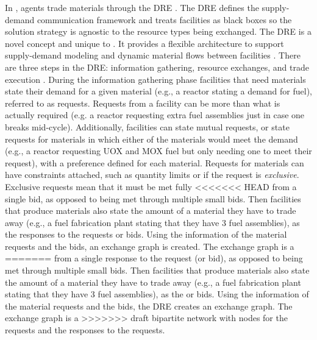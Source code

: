 In \Cyclus, agents trade materials through the \gls{DRE} 
\cite{gidden_agent-based_2015,huff_fundamental_2016}. The \gls{DRE} defines the 
supply-demand communication framework and treats facilities as black boxes
so the solution strategy is agnostic to the resource types being exchanged. 
The \gls{DRE} is a novel concept and unique to \Cyclus. It provides a 
flexible architecture to support supply-demand modeling and dynamic 
material flows between facilities \cite{huff_fundamental_2016}. 
There are three steps in the \gls{DRE}: information gathering, resource 
exchanges, and trade execution \cite{gidden_agent-based_2015}. 
During the information gathering 
phase facilities that need materials state their demand for a given 
material (e.g., a reactor stating a demand for fuel), referred to 
as requests. Requests 
from a facility can be more than what is actually required (e.g. a reactor
requesting extra fuel assemblies just in case one breaks mid-cycle). Additionally, 
facilities can state mutual requests, or state requests for materials in 
which either of the materials would meet the demand (e.g., a reactor 
requesting UOX and MOX fuel but only needing one to meet their request), with 
a preference defined for each material. Requests for materials can have 
constraints attached, such as quantity limits or if the request is 
\textit{exclusive}. Exclusive requests mean that it must be met fully 
<<<<<<< HEAD
from a single bid, as opposed to being met through multiple small 
bids. Then facilities that produce materials also state the amount of a 
material they have to trade away (e.g., a fuel fabrication plant stating 
that they have 3 fuel assemblies), as the responses to the requests or 
bids. Using the information of the material requests and the bids, 
an exchange graph is created. The exchange graph is a 
=======
from a single response to the request (or bid), as opposed to being met 
through multiple small 
bids. Then facilities that produce materials also state the amount of a 
material they have to trade away (e.g., a fuel fabrication plant stating 
that they have 3 fuel assemblies), as the or 
bids. Using the information of the material requests and the bids, 
the \gls{DRE} creates an exchange graph. The exchange graph is a 
>>>>>>> draft
bipartite network \cite{gidden_agent-based_2015}
with nodes for the requests and the responses to the requests. 

